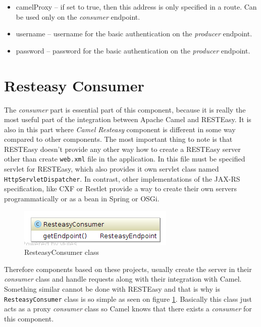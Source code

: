 \documentclass[12pt,final,oneside]{fithesis2}
\begin{document}
\begin{itemize}
\item 
camelProxy -- if set to true, then this address is only specified in a route. Can be used only on the \textit{consumer} endpoint.

\item
username -- username for the basic authentication on the \textit{producer} endpoint.

\item
password -- password for the basic authentication on the \textit{producer} endpoint.

\end{itemize}


\section{Resteasy Consumer}\label{consumer}
The \textit{consumer} part is essential part of this component, because it is really the most useful part of the integration between Apache Camel and RESTEasy. It is also in this part where \textit{Camel Resteasy} component is different in some way compared to other components. The most important thing to note is that RESTEasy doesn't provide any other way how to create a RESTEasy server other than create \texttt{web.xml} file in the application. In this file must be specified servlet for RESTEasy, which also provides it own servlet class named \texttt{HttpServletDispatcher}. In contrast, other implementations of the JAX-RS specification, like CXF or Restlet provide a way to create their own servers programmatically or as a bean in Spring or OSGi.

\begin{figure}[!h]
\centering
\includegraphics[width=0.6\linewidth]{images/consumer.png}
\caption{ResteasyConsumer class}
\label{fig-consumer}
\end{figure}

Therefore components based on these projects, usually create the server in their \textit{consumer} class and handle requests along with their integration with Camel. Something similar cannot be done with RESTEasy and that is why is \texttt{ResteasyConsumer} class is so simple as seen on figure \ref{fig-consumer}. Basically this class just acts as a proxy \textit{consumer} class so Camel knows that there exists a \textit{consumer} for this component.
\end{document}
